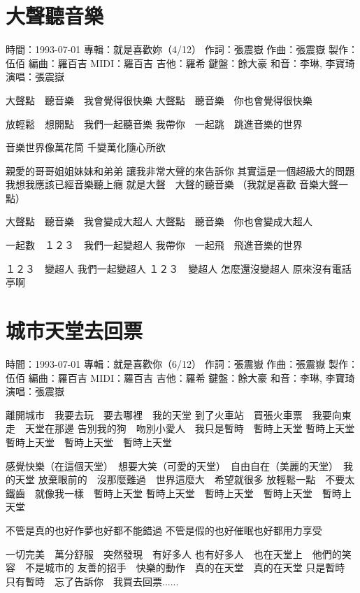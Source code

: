 \documentclass[UTF8,a4paper,oneside,twocolumn,12pt]{ctexbook}
\newcommand{\infopair}[2]{\textbullet #1：#2}
\newcommand{\zc}[1][伍佰]{\infopair{作詞}{#1}}
\newcommand{\zq}[1][伍佰]{\infopair{作曲}{#1}}
\newcommand{\bq}[1][伍佰]{\infopair{編曲}{#1}}
\newcommand{\zj}[1]{\infopair{專輯}{#1}}
\newcommand{\zz}[1]{\infopair{製作}{#1}}
\newcommand{\sj}[1]{\infopair{時間}{#1}}
\newenvironment{info}{\begin{flushleft}\kaishu
	}
	{\end{flushleft}\normalsize\yahei\par}
\newenvironment{lyric}{
	}
{}
\begin{document}
\section{大聲聽音樂}
\begin{info}
	\sj{1993-07-01}
	\zj{就是喜歡妳（4/12）}
	\zc[張震嶽]
	\zq[張震嶽]
	\zz{伍佰}
	\bq[羅百吉]
	\infopair{MIDI}{羅百吉}
	\infopair{吉他}{羅希}
	\infopair{鍵盤}{餘大豪}
	\infopair{和音}{李琳, 李寶琦}
	\infopair{演唱}{張震嶽}
\end{info}
\begin{lyric}
	大聲點　聽音樂　我會覺得很快樂
	大聲點　聽音樂　你也會覺得很快樂

	放輕鬆　想開點　我們一起聽音樂
	我帶你　一起跳　跳進音樂的世界

	音樂世界像萬花筒
	千變萬化隨心所欲

	親愛的哥哥姐姐妹妹和弟弟
	讓我非常大聲的來告訴你
	其實這是一個超級大的問題
	我想我應該已經音樂聽上癮
	就是大聲　大聲的聽音樂
	（我就是喜歡 音樂大聲一點）

	大聲點　聽音樂　我會變成大超人
	大聲點　聽音樂　你也會變成大超人

	一起數　１２３　我們一起變超人
	我帶你　一起飛　飛進音樂的世界

	１２３　變超人 我們一起變超人
	１２３　變超人 怎麼還沒變超人 原來沒有電話亭啊
\end{lyric}

\section{城市天堂去回票}
\begin{info}
	\sj{1993-07-01}
	\zj{就是喜歡你（6/12）}
	\zc[張震嶽]
	\zq[張震嶽]
	\zz{伍佰}
	\bq[羅百吉]
	\infopair{MIDI}{羅百吉}
	\infopair{吉他}{羅希}
	\infopair{鍵盤}{餘大豪}
	\infopair{和音}{李琳, 李寶琦}
	\infopair{演唱}{張震嶽}
\end{info}
\begin{lyric}
	離開城市　我要去玩　要去哪裡　我的天堂
	到了火車站　買張火車票　我要向東走　天堂在那邊
	告別我的狗　吻別小愛人　我只是暫時　暫時上天堂
	暫時上天堂　暫時上天堂　暫時上天堂　暫時上天堂

	感覺快樂（在這個天堂）　想要大笑（可愛的天堂）　自由自在（美麗的天堂）　我的天堂
	放棄眼前的　沒那麼難過　世界這麼大　希望就很多
	放輕鬆一點　不要太鐵齒　就像我一樣　暫時上天堂
	暫時上天堂　暫時上天堂　暫時上天堂　暫時上天堂

	不管是真的也好作夢也好都不能錯過
	不管是假的也好催眠也好都用力享受

	一切完美　萬分舒服　突然發現　有好多人
	也有好多人　也在天堂上　他們的笑容　不是城市的
	友善的招手　快樂的動作　真的在天堂　真的在天堂
	只是暫時　只有暫時　忘了告訴你　我買去回票......
\end{lyric}
\end{document}
